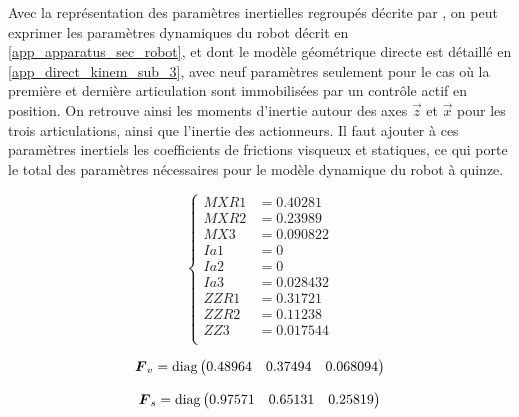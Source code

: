 \begin{appendices}
	Avec la représentation des paramètres inertielles regroupés décrite par \textcite[Chapitre~9, (9.53)]{khalil_modeling_2002}, on peut exprimer les paramètres dynamiques du robot décrit en \cref{app_apparatus_sec_robot}, et dont le modèle géométrique directe est détaillé en \cref{app_direct_kinem_sub_3}, avec neuf paramètres seulement pour le cas où la première et dernière articulation sont immobilisées par un contrôle actif en position.  On retrouve ainsi les moments d'inertie autour des axes $\vec{z}$ et $\vec{x}$ pour les trois articulations, ainsi que l'inertie des actionneurs.
	Il faut ajouter à ces paramètres inertiels les coefficients de frictions visqueux et statiques, ce qui porte le total des paramètres nécessaires pour le modèle dynamique du robot à quinze.
	
	\begin{equation}
		\begin{cases}
			MXR1 &= 0.40281\\
			MXR2 &= 0.23989\\
			MX3 &= 0.090822\\
			Ia1 &= 0\\
			Ia2 &= 0\\
			Ia3 &= 0.028432\\
			ZZR1 &= 0.31721\\
			ZZR2 &= 0.11238\\
			ZZ3 &= 0.017544\\
		\end{cases}
	\end{equation}
	
	\begin{equation}
		\matr{F}_v = \text{diag}%
		\begin{pmatrix}
			0.48964 & 0.37494 & 0.068094
		\end{pmatrix}
	\end{equation}

	\begin{equation}
		\matr{F}_s = \text{diag}%
		\begin{pmatrix}
			0.97571 & 0.65131 & 0.25819
		\end{pmatrix}
	\end{equation}
	
	
\end{appendices}